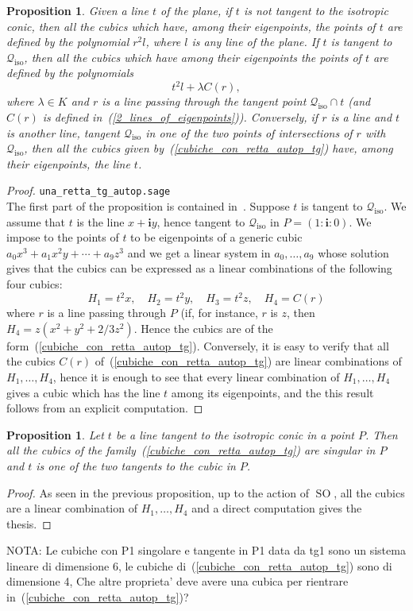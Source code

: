 \documentclass{amsart}
\theoremstyle{plain}
\newtheorem{prop}[lemma]{Proposition}
\theoremstyle{definition}
\newcommand{\iso}{\mathcal{Q}_{\mathrm{iso}}}
\newcommand{\SO}{\operatorname{SO}}
\newcommand{\iii}{\textbf{i}}
\begin{document}
\begin{prop}
Given a line $t$ of the plane, if $t$ is not tangent to the isotropic
conic, then all the cubics which have, among their
eigenpoints, the points of $t$ are defined by the polynomial $r^2l$,
where $l$ is any line of the plane. If $t$ is tangent to $\iso$, then
all the cubics which have among their eigenpoints the points of $t$ are
defined by the polynomials
\begin{equation}
\label{cubiche_con_retta_autop_tg}
t^2l+\lambda C(r),
\end{equation}
where $\lambda \in K$ and $r$ is a line
passing through the tangent point $\iso\cap t$ (and $C(r)$ is defined
in~(\ref{2_lines_of_eigenpoints})). Conversely, if $r$ is a line and
$t$ is another line, tangent $\iso$ in one of the two points of intersections
of $r$ with $\iso$, then all the cubics given
by~(\ref{cubiche_con_retta_autop_tg}) have, among their eigenpoints,
the line $t$.
\end{prop}
\begin{proof}
\verb+una_retta_tg_autop.sage+\\
The first part of the proposition is contained in~.
Suppose $t$ is tangent to $\iso$. We assume that $t$ is the line
$x+\iii y$, hence tangent to $\iso$ in $P = (1: \iii: 0)$.
We impose to the points
of $t$ to be eigenpoints of a generic cubic $a_0x^3+a_1x^2y+\cdots+a_9z^3$
and we get a linear system in $a_0, \dots, a_9$ whose solution gives that
the cubics can be expressed as a linear combinations of the following
four cubics:
%
\[
H_1 = t^2x, \quad H_2 = t^2y, \quad H_3 = t^2z, \quad H_4 = C(r)
\]
%
where $r$ is a line passing through $P$ (if, for instance, $r$
is $z$, then $H_4 = z(x^2 + y^2 + 2/3z^2)$. Hence the cubics are of the
form~(\ref{cubiche_con_retta_autop_tg}). Conversely, it is easy to verify
that all the cubics $C(r)$ of~(\ref{cubiche_con_retta_autop_tg}) are
linear combinations of $H_1, \dots, H_4$, hence it is enough
to see that every linear combination of $H_1, \dots, H_4$ gives a
cubic which has the line $t$ among its eigenpoints, and the this result
follows from an explicit computation.
\end{proof}

\begin{prop}
Let $t$ be a line tangent to the isotropic conic in a point $P$. Then all the
cubics of the family~(\ref{cubiche_con_retta_autop_tg}) are singular in
$P$ and $t$ is one of the two tangents to the cubic in $P$.
\end{prop}
\begin{proof}
As seen in the previous proposition, up to the action of $\SO$, all the
cubics are a linear combination of $H_1, \dots, H_4$ and a direct
computation gives the thesis.
\end{proof}
NOTA: Le cubiche con P1 singolare e tangente in P1 data da tg1 sono
un sistema lineare di dimensione 6, le cubiche
di~(\ref{cubiche_con_retta_autop_tg}) sono di dimensione
4, Che altre proprieta' deve avere una cubica per rientrare
in~(\ref{cubiche_con_retta_autop_tg})?
\end{document}
